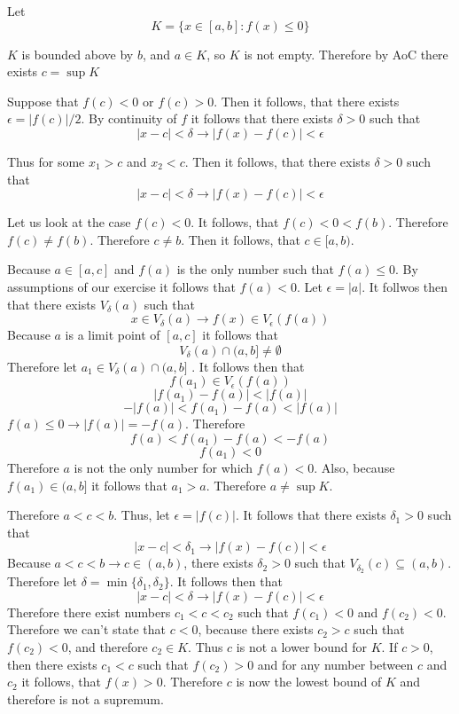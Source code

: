 \documentclass[11pt,oneside,titlepage]{book}
\begin{document}
Let
$$K = \{x \in [a, b]: f(x) \leq 0\}$$

$K$ is bounded above by $b$, and $a \in K$, so $K$ is not empty. Therefore
by AoC there exists $c = \sup{K}$

Suppose that $f(c) < 0$ or $f(c) > 0$. Then it follows, that there exists
$\epsilon = |f(c)| / 2$. By continuity of $f$ it follows that there exists
$\delta > 0$ such that
$$|x - c| < \delta \to |f(x) - f(c)| < \epsilon$$

Thus for some $x_1 > c$ and $x_2 < c$. Then it follows, that there exists
$\delta > 0$ such that
$$|x - c| < \delta \to |f(x) - f(c)| < \epsilon$$


Let us look at the case $f(c) < 0$. It follows, that $f(c) < 0 < f(b)$.
Therefore $f(c) \neq f(b)$. Therefore $c \neq b$. Then it follows, that
$c \in [a, b)$. 

Because $a \in [a, c]$ and $f(a)$ is the only number such that $f(a) \leq 0$.
By assumptions  of our exercise it follows that $f(a) < 0$.
Let $\epsilon = |a|$. It follwos then that there exists $V_\delta(a)$
such that
$$x \in V_\delta(a) \to f(x) \in V_\epsilon(f(a))$$
Because $a$ is a limit point of $[a, c]$ it follows that
$$V_\delta(a) \cap (a, b] \neq \emptyset$$
Therefore let $a_1 \in V_\delta(a) \cap (a, b]$ . It follows then
that
$$f(a_1) \in V_\epsilon(f(a))$$
$$|f(a_1) - f(a) | < |f(a) |$$
$$-|f(a)| < f(a_1) - f(a) < |f(a)|$$
$f(a) \leq 0 \to |f(a)| = -f(a)$. Therefore
$$f(a) < f(a_1) - f(a) < - f(a)$$
$$f(a_1) < 0 $$
Therefore $a$ is not the only number for which $f(a) < 0$. Also, because
$f(a_1) \in (a, b]$ it follows that $a_1 > a$. Therefore
$a \neq \sup{K}$. 

Therefore $a < c < b$. Thus, let $\epsilon = |f(c)|$. It follows that
there exists $\delta_1 > 0$ such that 
$$|x - c| < \delta_1 \to |f(x) - f(c)| < \epsilon$$
Because $a < c < b \to c \in (a, b)$, there exists $\delta_2 > 0$ such that
$V_{\delta_2}(c) \subseteq (a, b)$. Therefore let
$\delta = \min\{\delta_1, \delta_2\}$. It follows then that
$$|x - c| < \delta \to |f(x) - f(c)| < \epsilon$$
Therefore there exist numbers $c_1 < c < c_2$ such that
$f(c_1) < 0$ and $f(c_2) < 0$.
Therefore we can't state that $c < 0$, because there exists $c_2 > c$ such that
$f(c_2) < 0$, and therefore $c_2 \in K$. Thus $c$ is not a lower bound for
$K$. If $c > 0$, then there exists
$c_1 < c$ such that $f(c_2) > 0$ and for any number between $c$ and $c_2$ it
follows, that $f(x) > 0$. Therefore $c$ is now the lowest bound of $K$ and
therefore is not a supremum.
\end{document}
